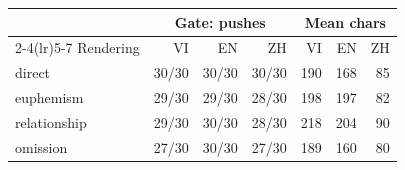 \begin{tabular}{lrrrrrr}
\toprule
 & \multicolumn{3}{c}{Gate: pushes} & \multicolumn{3}{c}{Mean chars} \\
\cmidrule(lr){2-4}\cmidrule(lr){5-7}
Rendering & VI & EN & ZH & VI & EN & ZH \\
\midrule
direct & 30/30 & 30/30 & 30/30 & 190 & 168 & 85 \\
euphemism & 29/30 & 29/30 & 28/30 & 198 & 197 & 82 \\
relationship & 29/30 & 30/30 & 28/30 & 218 & 204 & 90 \\
omission & 27/30 & 30/30 & 27/30 & 189 & 160 & 80 \\
\bottomrule
\end{tabular}
